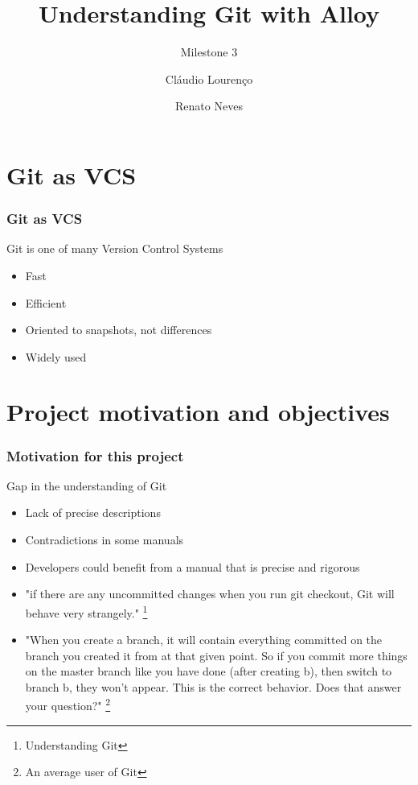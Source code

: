 \documentclass{beamer}
\title{Understanding Git with Alloy}
\subtitle{Milestone 3}
\author{Cláudio Lourenço \and Renato Neves}
\institute{University of Minho\\
Formal Methods in Software Engineering}
\begin{document}
\frame {
   \titlepage
}


\section{Git as VCS}

\begin{frame}
	\frametitle{Git as VCS}
	\begin{block}{Git is one of many Version Control Systems}
		\begin{itemize}
		\item Fast
		\item Efficient
		\item Oriented to snapshots, not differences
		\item Widely used
	\end{itemize}
	\end{block}
\end{frame}

\section{Project motivation and objectives}
\begin{frame}
	\frametitle{Motivation for this project}
	\begin{block}{Gap in the understanding of Git}
		\begin{itemize}
		\item Lack of precise descriptions
		\item Contradictions in some manuals
		\item Developers could benefit from a manual
		that is precise and rigorous
		\end{itemize}
	\end{block}
\end{frame}

\begin{frame}
	\begin{itemize}
	\item "if there are any uncommitted changes when you run git checkout,
	 Git will behave very strangely." \footnote{Understanding Git}
	\item "When you create a branch, it will contain everything
         committed on the branch you created it from at that given
         point. So if you commit more things on the master branch like
         you have done (after creating b), then switch to branch b,
         they won't appear. This is the correct behavior. Does that
         answer your question?" \footnote{An average user of Git} 
	\end{itemize}
\end{frame}
\end{document}

